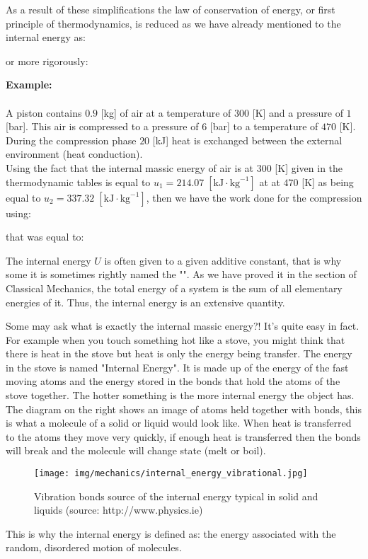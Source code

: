 	As a result of these simplifications the law of conservation of energy, or first principle of thermodynamics, is reduced as we have already mentioned to the internal energy as:
	
	or more rigorously:
	
	\begin{tcolorbox}[colframe=black,colback=white,sharp corners]
	\textbf{{\Large {}}Example:}\\\\
	A piston contains $0.9$ [kg] of air at a temperature of $300$ [K] and a pressure of $1$ [bar]. This air is compressed to a pressure of $6$ [bar] to a temperature of $470$ [K]. During the compression phase $20$ [kJ] heat is exchanged between the external environment (heat conduction).\\

	Using the fact that the internal massic energy of air is at $300$ [K] given in the thermodynamic tables is equal to $u_1=214.07\;[\text{kJ}\cdot \text{kg}^{-1}]$ at at $470$ [K] as being equal to  $u_2=337.32\;[\text{kJ}\cdot \text{kg}^{-1}]$, then we have the work done for the compression using:
	
	that was equal to:
	\end{tcolorbox}
	\begin{tcolorbox}[title=Remark,colframe=black,arc=10pt]
	The internal energy $U$ is often given to a given additive constant, that is why some it is sometimes rightly named the "". As we have proved it in the section of Classical Mechanics, the total energy of a system is the sum of all elementary energies of it. Thus, the internal energy is an extensive quantity.
	\end{tcolorbox}
	Some may ask what is exactly the internal massic energy?! It's quite easy in fact. For example when you touch something hot like a stove, you might think that there is heat in the stove but heat is only the energy being transfer. The energy in the stove is named "Internal Energy". It is made up of the energy of the fast moving atoms and the energy stored in the bonds that hold the atoms of the stove together. The hotter something is the more internal energy the object has. The diagram on the right shows an image of atoms held together with bonds, this is what a molecule of a solid or liquid would look like. When heat is transferred to the atoms they move very quickly, if enough heat is transferred then the bonds will break and the molecule will change state (melt or boil).
	\begin{figure}[H]
		\centering
		\texttt{[image: img/mechanics/internal\_energy\_vibrational.jpg]}
		\caption[]{Vibration bonds source of the internal energy typical in solid and liquids (source: http://www.physics.ie)}
	\end{figure}
	This is why the internal energy is defined as: the energy associated with the random, disordered motion of molecules. 
	
